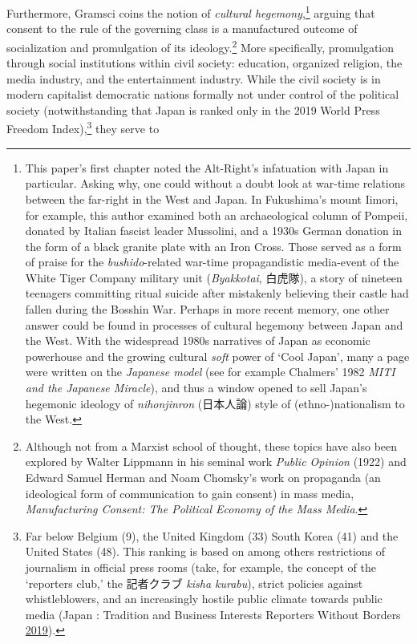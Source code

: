 \documentclass[10pt,british,A4paper,twoside]{memoir}
\begin{document}
Furthermore, Gramsci coins the notion of \emph{cultural
hegemony},\footnote{This paper's first chapter noted the Alt-Right's
  infatuation with Japan in particular. Asking why, one could without a
  doubt look at war-time relations between the far-right in the West and
  Japan. In Fukushima's mount Iimori, for example, this author examined
  both an archaeological column of Pompeii, donated by Italian fascist
  leader Mussolini, and a 1930s German donation in the form of a black
  granite plate with an Iron Cross. Those served as a form of praise for
  the \emph{bushido}-related war-time propagandistic media-event of the
  White Tiger Company military unit (\emph{Byakkotai}, 白虎隊), a story
  of nineteen teenagers committing ritual suicide after mistakenly
  believing their castle had fallen during the Bosshin War. Perhaps in
  more recent memory, one other answer could be found in processes of
  cultural hegemony between Japan and the West. With the widespread
  1980s narratives of Japan as economic powerhouse and the growing
  cultural \emph{soft} power of `Cool Japan', many a page were written
  on the \emph{Japanese model} (see for example Chalmers' 1982
  \emph{MITI and the Japanese Miracle}), and thus a window opened to
  sell Japan's hegemonic ideology of \emph{nihonjinron} (日本人論) style
  of (ethno-)nationalism to the West.} arguing that consent to the rule
of the governing class is a manufactured outcome of socialization and
promulgation of its ideology.\footnote{Although not from a Marxist
  school of thought, these topics have also been explored by Walter
  Lippmann in his seminal work \emph{Public Opinion} (1922) and Edward
  Samuel Herman and Noam Chomsky's work on propaganda (an ideological
  form of communication to gain consent) in mass media,
  \emph{Manufacturing Consent: The Political Economy of the Mass Media}.}
More specifically, promulgation through social institutions within civil
society: education, organized religion, the media industry, and the
entertainment industry. While the civil society is in modern capitalist
democratic nations formally not under control of the political society
(notwithstanding that Japan is ranked only  in the 2019 World
Press Freedom Index),\footnote{Far below Belgium (9), the United Kingdom
  (33) South Korea (41) and the United States (48). This ranking is
  based on among others restrictions of journalism in official press
  rooms (take, for example, the concept of the `reporters club,' the 記者クラブ \emph{kisha
  kurabu}), strict policies against whistleblowers, and an increasingly
  hostile public climate towards public media (Japan : Tradition and
  Business Interests Reporters Without Borders
  \protect\hyperlink{ref-noauthor_japan_2019}{2019}).} they serve to
\end{document}
